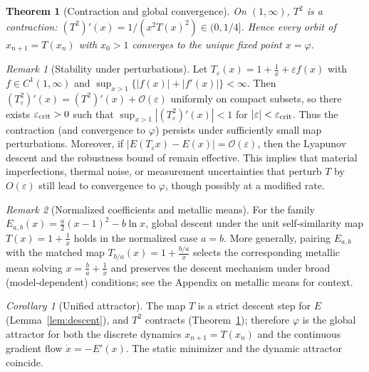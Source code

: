 \documentclass[11pt]{article}
\newtheorem{theorem}{Theorem}
\theoremstyle{remark}
\newtheorem{remark}{Remark}
\newtheorem{corollary}{Corollary}[theorem]
\theoremstyle{definition}
\begin{document}
\begin{theorem}[Contraction and global convergence]
\label{thm:contraction}
On \((1,\infty)\), \(T^2\) is a contraction: \((T^2)'(x)=1/(x^2T(x)^2)\in(0,1/4]\). Hence every orbit of \(x_{n+1}=T(x_n)\) with \(x_0>1\) converges to the unique fixed point \(x=\varphi\).
\end{theorem}
\begin{remark}[Stability under perturbations]
Let $T_\varepsilon(x)=1+\frac{1}{x}+\varepsilon f(x)$ with $f\in C^1(1,\infty)$ and $\sup_{x>1}\{|f(x)|+|f'(x)|\}<\infty$.
Then $(T_\varepsilon^2)'(x)=(T^2)'(x)+\mathcal{O}(\varepsilon)$ uniformly on compact subsets, so there exists $\varepsilon_{\rm crit}>0$
such that $\sup_{x>1}|(T_\varepsilon^2)'(x)|<1$ for $|\varepsilon|<\varepsilon_{\rm crit}$. Thus the contraction (and convergence to $\varphi$)
persists under sufficiently small map perturbations. Moreover, if $|E(T_\varepsilon x)-E(x)|=\mathcal{O}(\varepsilon)$, then the Lyapunov descent and the robustness bound of  remain effective.  This implies that material imperfections, thermal noise, or measurement uncertainties that perturb $T$ by $O(\varepsilon)$ still lead to convergence to $\varphi$, though possibly at a modified rate.\end{remark}
\begin{remark}[Normalized coefficients and metallic means]
For the family $E_{a,b}(x)=\tfrac{a}{2}(x-1)^2-b\ln x$, global descent under the unit self-similarity map
$T(x)=1+\tfrac{1}{x}$ holds in the normalized case $a=b$. More generally, pairing $E_{a,b}$ with the matched map
$T_{b/a}(x)=1+\tfrac{b/a}{x}$ selects the corresponding metallic mean solving $x=\tfrac{b}{a}+\tfrac{1}{x}$ and
preserves the descent mechanism under broad (model-dependent) conditions; see the Appendix on metallic means for context.
\end{remark}



\begin{corollary}[Unified attractor]
\label{cor:unified}
The map \(T\) is a strict descent step for \(E\) (Lemma~\ref{lem:descent}), and \(T^2\) contracts (Theorem~\ref{thm:contraction}); therefore \(\varphi\) is the global attractor for both the discrete dynamics \(x_{n+1}=T(x_n)\) and the continuous gradient flow \(\dot x=-E'(x)\). The static minimizer and the dynamic attractor coincide.
\end{corollary}
\end{document}
